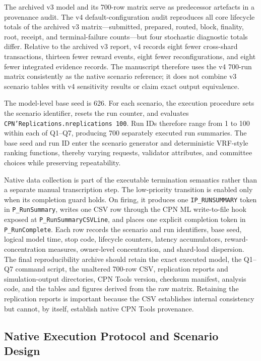 \documentclass[a4paper,fleqn]{cas-sc}
\begin{document}
The archived v3 model and its 700-row matrix serve as predecessor artefacts in a provenance audit. The v4 default-configuration audit reproduces all core lifecycle totals of the archived v3 matrix---submitted, prepared, routed, block, finality, root, receipt, and terminal-failure counts---but four stochastic diagnostic totals differ. Relative to the archived v3 report, v4 records eight fewer cross-shard transactions, thirteen fewer reward events, eight fewer reconfigurations, and eight fewer integrated evidence records. The manuscript therefore uses the v4 700-run matrix consistently as the native scenario reference; it does not combine v3 scenario tables with v4 sensitivity results or claim exact output equivalence.

The model-level base seed is 626. For each scenario, the execution procedure sets the scenario identifier, resets the run counter, and evaluates
\texttt{CPN'Replications.}\allowbreak\texttt{nreplications~100}. Run IDs
therefore range from 1 to 100 within each of Q1--Q7, producing 700 separately
executed run summaries. The base seed and run ID enter the scenario generator
and deterministic VRF-style ranking functions, thereby varying requests,
validator attributes, and committee choices while preserving repeatability.

Native data collection is part of the executable termination semantics rather
than a separate manual transcription step. The low-priority transition
\texttt{} is enabled only when its
completion guard holds. On firing, it produces one \texttt{IP\_RUNSUMMARY}
token in \texttt{P\_RunSummary}, writes one CSV row through the CPN ML
write-to-file hook exposed at \texttt{P\_RunSummaryCSVLine}, and places one
explicit completion token in \texttt{P\_RunComplete}. Each row records the
scenario and run identifiers, base seed, logical model time, stop code,
lifecycle counters, latency accumulators, reward-concentration measures,
owner-level concentration, and shard-load dispersion. The final reproducibility
archive should retain the exact executed model, the Q1--Q7 command script, the
unaltered 700-row CSV, replication reports and simulation-output directories,
CPN Tools version, checksum manifest, analysis code, and the tables and figures
derived from the raw matrix. Retaining the replication reports is important
because the CSV establishes internal consistency but cannot, by itself,
establish native CPN Tools provenance.

\subsection{Native Execution Protocol and Scenario Design}
\label{subsec:scenarios}
\end{document}
